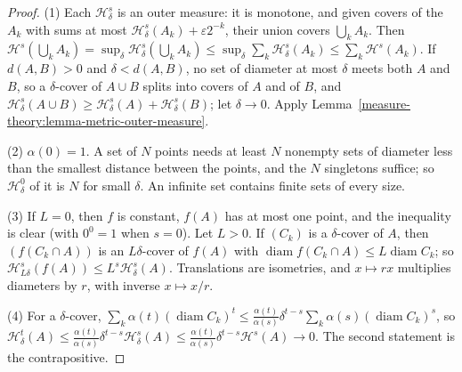 \begin{proof}
(1) Each $\mathcal{H}^s_\delta$ is an outer measure: it is monotone, and given covers of the $A_k$ with sums at most $\mathcal{H}^s_\delta(A_k) + \varepsilon2^{-k}$, their union covers
$\bigcup_kA_k$. Then $\mathcal{H}^s(\bigcup_kA_k) = \sup_\delta\mathcal{H}^s_\delta(\bigcup_kA_k) \leq \sup_\delta\sum_k\mathcal{H}^s_\delta(A_k) \leq \sum_k\mathcal{H}^s(A_k)$. If
$d(A, B) > 0$ and $\delta < d(A, B)$, no set of diameter at most $\delta$ meets both $A$ and $B$, so a $\delta$-cover of $A \cup B$ splits into covers of $A$ and of $B$, and
$\mathcal{H}^s_\delta(A \cup B) \geq \mathcal{H}^s_\delta(A) + \mathcal{H}^s_\delta(B)$; let $\delta \to 0$. Apply Lemma~\ref{measure-theory:lemma-metric-outer-measure}.

(2) $\alpha(0) = 1$. A set of $N$ points needs at least $N$ nonempty sets of diameter less than the smallest distance between the points, and the $N$ singletons suffice; so
$\mathcal{H}^0_\delta$ of it is $N$ for small $\delta$. An infinite set contains finite sets of every size.

(3) If $L = 0$, then $f$ is constant, $f(A)$ has at most one point, and the inequality is clear (with $0^0 = 1$ when $s = 0$). Let $L > 0$. If $(C_k)$ is a
$\delta$-cover of $A$, then $(f(C_k \cap A))$ is an $L\delta$-cover of $f(A)$ with $\operatorname{diam}f(C_k \cap A) \leq L\operatorname{diam}C_k$; so
$\mathcal{H}^s_{L\delta}(f(A)) \leq L^s\mathcal{H}^s_\delta(A)$. Translations are isometries, and $x \mapsto rx$ multiplies diameters by $r$, with inverse $x \mapsto x/r$.

(4) For a $\delta$-cover, $\sum_k\alpha(t)(\operatorname{diam}C_k)^t \leq \frac{\alpha(t)}{\alpha(s)}\delta^{t-s}\sum_k\alpha(s)(\operatorname{diam}C_k)^s$, so
$\mathcal{H}^t_\delta(A) \leq \frac{\alpha(t)}{\alpha(s)}\delta^{t-s}\mathcal{H}^s_\delta(A) \leq \frac{\alpha(t)}{\alpha(s)}\delta^{t-s}\mathcal{H}^s(A) \to 0$. The second statement is the
contrapositive.
\end{proof}

